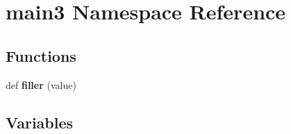 \hypertarget{namespacemain3}{}\section{main3 Namespace Reference}
\label{namespacemain3}
\subsection*{Functions}
\begin{DoxyCompactItemize}
\item 
def {\bfseries filler} (value)\hypertarget{namespacemain3_aa239f75780b37f42f810fa32d138251b}{}\label{namespacemain3_aa239f75780b37f42f810fa32d138251b}

\end{DoxyCompactItemize}
\subsection*{Variables}
